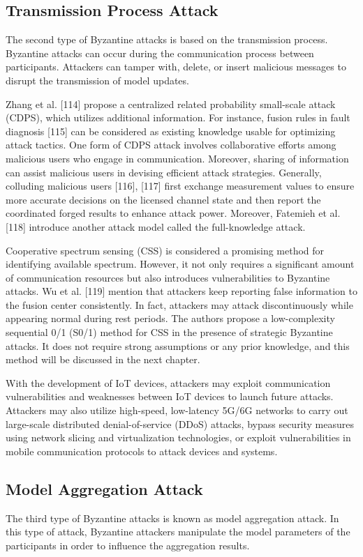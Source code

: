 \subsection{Transmission Process Attack}  
The second type of Byzantine attacks is based on
the transmission process. Byzantine attacks can occur
during the communication process between participants.
Attackers can tamper with, delete, or insert malicious
messages to disrupt the transmission of model updates. 

Zhang et al. [114] propose a centralized related
probability small-scale attack (CDPS), which utilizes additional
information. For instance, fusion rules in fault diagnosis
[115] can be considered as existing knowledge usable
for optimizing attack tactics. One form of CDPS attack
involves collaborative efforts among malicious users who
engage in communication. Moreover, sharing of
information can assist malicious users in devising eﬀicient attack
strategies. Generally, colluding malicious users [116], [117]
first exchange measurement values to ensure more accurate
decisions on the licensed channel state and then report
the coordinated forged results to enhance attack power.
Moreover, Fatemieh et al. [118] introduce another attack
model called the full-knowledge attack.  

Cooperative spectrum sensing (CSS) is considered a
promising method for identifying available spectrum.
However, it not only requires a significant amount of
communication resources but also introduces vulnerabilities to
Byzantine attacks. Wu et al. [119] mention that attackers
keep reporting false information to the fusion center
consistently. In fact, attackers may attack discontinuously
while appearing normal during rest periods. The authors
propose a low-complexity sequential 0/1 (S0/1) method
for CSS in the presence of strategic Byzantine attacks.
It does not require strong assumptions or any prior
knowledge, and this method will be discussed in the next
chapter.

With the development of IoT devices, attackers may
exploit communication vulnerabilities and weaknesses
between IoT devices to launch future attacks. Attackers may
also utilize high-speed, low-latency 5G/6G networks to
carry out large-scale distributed denial-of-service (DDoS)
attacks, bypass security measures using network slicing
and virtualization technologies, or exploit vulnerabilities
in mobile communication protocols to attack devices and
systems.  

\subsection{Model Aggregation Attack}  
The third type of Byzantine attacks is known as model
aggregation attack. In this type of attack, Byzantine
attackers manipulate the model parameters of the
participants in order to influence the aggregation results.  


